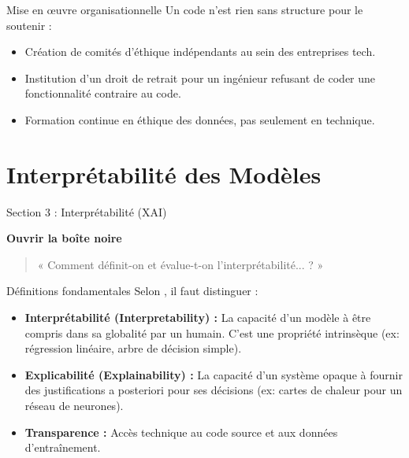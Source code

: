 \documentclass[9pt, aspectratio=169]{beamer}
\begin{document}
\begin{frame}{Mise en \oe uvre organisationnelle}
    Un code n'est rien sans structure pour le soutenir :
    \begin{itemize}
        \item Création de comités d'éthique indépendants au sein des entreprises tech.
        \item Institution d'un droit de retrait pour un ingénieur refusant de coder une fonctionnalité contraire au code.
        \item Formation continue en éthique des données, pas seulement en technique.
    \end{itemize}
\end{frame}

\section{Interprétabilité des Modèles}

\begin{frame}{Section 3 : Interprétabilité (XAI)}
    \begin{center}
        \Large \textbf{Ouvrir la boîte noire}
    \end{center}
    \vspace{1cm}
    \begin{quote}
        « Comment définit-on et évalue-t-on l'interprétabilité... ? »
    \end{quote}
\end{frame}

\begin{frame}{Définitions fondamentales}
    Selon \cite{Doran2002What}, il faut distinguer :
    \begin{itemize}
        \item \textbf{Interprétabilité (Interpretability) :} La capacité d'un modèle à être compris dans sa globalité par un humain. C'est une propriété intrinsèque (ex: régression linéaire, arbre de décision simple).
        \item \textbf{Explicabilité (Explainability) :} La capacité d'un système opaque à fournir des justifications a posteriori pour ses décisions (ex: cartes de chaleur pour un réseau de neurones).
        \item \textbf{Transparence :} Accès technique au code source et aux données d'entraînement.
    \end{itemize}
\end{frame}
\end{document}
